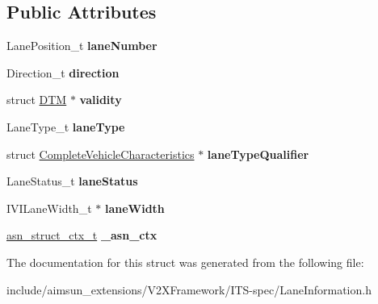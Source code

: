 \subsection*{Public Attributes}
\begin{DoxyCompactItemize}
\item 
Lane\+Position\+\_\+t {\bfseries lane\+Number}\hypertarget{structLaneInformation_a80d0e8966e6e1873724a595b13b25fb9}{}\label{structLaneInformation_a80d0e8966e6e1873724a595b13b25fb9}

\item 
Direction\+\_\+t {\bfseries direction}\hypertarget{structLaneInformation_a6131cd80843a9b3b15800f0ea2aa541a}{}\label{structLaneInformation_a6131cd80843a9b3b15800f0ea2aa541a}

\item 
struct \hyperlink{structDTM}{D\+TM} $\ast$ {\bfseries validity}\hypertarget{structLaneInformation_a48905d5edc4d4cdc4071202702088e8a}{}\label{structLaneInformation_a48905d5edc4d4cdc4071202702088e8a}

\item 
Lane\+Type\+\_\+t {\bfseries lane\+Type}\hypertarget{structLaneInformation_aaa0e741abffb5c02613516254f8ddc36}{}\label{structLaneInformation_aaa0e741abffb5c02613516254f8ddc36}

\item 
struct \hyperlink{structCompleteVehicleCharacteristics}{Complete\+Vehicle\+Characteristics} $\ast$ {\bfseries lane\+Type\+Qualifier}\hypertarget{structLaneInformation_a5d2a145a14bd39e1a358a70342548f53}{}\label{structLaneInformation_a5d2a145a14bd39e1a358a70342548f53}

\item 
Lane\+Status\+\_\+t {\bfseries lane\+Status}\hypertarget{structLaneInformation_a5c5d2aaf9a5bf1a09eb44c37b077d5c3}{}\label{structLaneInformation_a5c5d2aaf9a5bf1a09eb44c37b077d5c3}

\item 
I\+V\+I\+Lane\+Width\+\_\+t $\ast$ {\bfseries lane\+Width}\hypertarget{structLaneInformation_a7902249ad98f9c021450921b13d92281}{}\label{structLaneInformation_a7902249ad98f9c021450921b13d92281}

\item 
\hyperlink{structasn__struct__ctx__s}{asn\+\_\+struct\+\_\+ctx\+\_\+t} {\bfseries \+\_\+asn\+\_\+ctx}\hypertarget{structLaneInformation_a8992a3d8dee49bbce1014b9b9e50c382}{}\label{structLaneInformation_a8992a3d8dee49bbce1014b9b9e50c382}

\end{DoxyCompactItemize}


The documentation for this struct was generated from the following file\+:\begin{DoxyCompactItemize}
\item 
include/aimsun\+\_\+extensions/\+V2\+X\+Framework/\+I\+T\+S-\/spec/Lane\+Information.\+h\end{DoxyCompactItemize}
